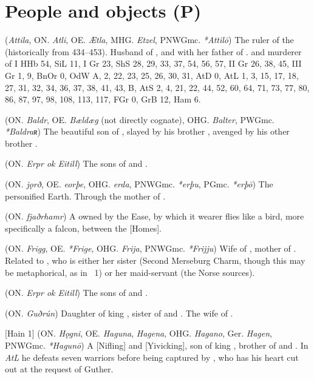 \section{People and objects (P)}

\begin{itemize}

 (\emph{Attila}, ON. \emph{Atli}, OE. \emph{Ætla}, MHG. \emph{Etzel}, PNWGmc. \emph{*Attilō})
  The ruler of the  (historically from 434–453). Husband of , and with her father of . and murderer of
  I HHb 54, SiL 11, I Gr 23, ShS 28, 29, 33, 37, 54, 56, 57, II Gr 26, 38, 45, III Gr 1, 9, BnOr 0, OdW A, 2, 22, 23, 25, 26, 30, 31, AtD 0, AtL 1, 3, 15, 17, 18, 27, 31, 32, 34, 36, 37, 38, 41, 43, B, AtS 2, 4, 21, 22, 44, 52, 60, 64, 71, 73, 77, 80, 86, 87, 97, 98, 108, 113, 117, FGr 0, GrB 12, Ham 6.

 (ON. \emph{Baldr}, OE. \emph{Bældæg} (not directly cognate), OHG. \emph{Balter}, PWGmc. \emph{*Baldraʀ})
  The beautiful son of , slayed by his brother , avenged by his other brother .

 (ON. \emph{Erpr ok Eitill})
  The sons of  and .

 (ON. \emph{jǫrð}, OE. \emph{eorþe}, OHG. \emph{erda}, PNWGmc. \emph{*erþu}, PGmc. \emph{*erþō})
  The personified Earth. Through  the mother of .

 (ON. \emph{fjaðrhamr})
  A  owned by the Ease, by which it wearer flies like a bird, more specifically a falcon, between the [Homes].

 (ON. \emph{Frigg}, OE. \emph{*Frige}, OHG. \emph{Frija}, PNWGmc. \emph{*Frijju})
  Wife of , mother of . Related to , who is either her sister (Second Merseburg Charm, though this may be metaphorical, as in \Hyndluljod\ 1) or her maid-servant (the Norse sources).

 (ON. \emph{Erpr ok Eitill})
  The sons of  and .

 (ON. \emph{Guðrún})
  Daughter of king , sister of  and . The wife of .

[Hain 1] (ON. \emph{Hǫgni}, OE. \emph{Haguna}, \emph{Hagena}, OHG. \emph{Hagano}, Ger. \emph{Hagen}, PNWGmc. \emph{*Hagunō})
  A [Nifling] and [Yivicking], son of king , brother of  and . In \emph{AtL} he defeats seven warriors before being captured by , who has his heart cut out at the request of Guther.


\end{itemize}
